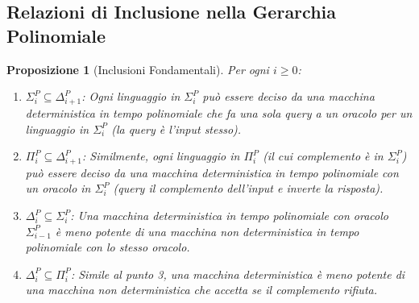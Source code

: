 \documentclass[a4paper]{article}
\newtheorem{proposition}{Proposizione}
\begin{document}
\subsection{Relazioni di Inclusione nella Gerarchia Polinomiale}
\begin{proposition}[Inclusioni Fondamentali]
Per ogni $i \ge 0$:
\begin{enumerate}
    \item $\Sigma_i^P \subseteq \Delta_{i+1}^P$: Ogni linguaggio in $\Sigma_i^P$ può essere deciso da una macchina deterministica in tempo polinomiale che fa una sola query a un oracolo per un linguaggio in $\Sigma_i^P$ (la query è l'input stesso).
    \item $\Pi_i^P \subseteq \Delta_{i+1}^P$: Similmente, ogni linguaggio in $\Pi_i^P$ (il cui complemento è in $\Sigma_i^P$) può essere deciso da una macchina deterministica in tempo polinomiale con un oracolo in $\Sigma_i^P$ (query il complemento dell'input e inverte la risposta).
    \item $\Delta_i^P \subseteq \Sigma_i^P$: Una macchina deterministica in tempo polinomiale con oracolo $\Sigma_{i-1}^P$ è meno potente di una macchina non deterministica in tempo polinomiale con lo stesso oracolo.
    \item $\Delta_i^P \subseteq \Pi_i^P$: Simile al punto 3, una macchina deterministica è meno potente di una macchina non deterministica che accetta se il complemento rifiuta.
\end{enumerate}
\end{proposition}
\end{document}
